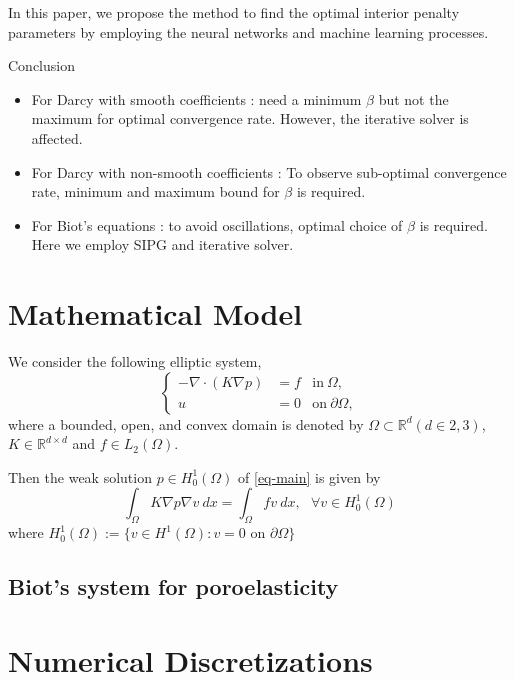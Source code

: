 \documentclass[11pt]{article}
\begin{document}
In this paper, we propose the method to find the optimal interior penalty parameters by employing the neural networks and machine learning processes. 


Conclusion
\begin{itemize}
\item For Darcy with smooth coefficients : need a minimum $\beta$ but not the maximum for optimal convergence rate. However, the iterative solver is affected.
\item For Darcy with non-smooth coefficients : To observe sub-optimal convergence rate, minimum and maximum bound for $\beta$ is required. 
\item For Biot's equations : to avoid oscillations, optimal choice of $\beta$ is required. Here we employ SIPG and iterative solver. 
\end{itemize}

\section{Mathematical Model}
We consider the following elliptic system,  
\begin{equation}\label{eq-main}
\left\{ 
\begin{array}{rll} 
-\nabla \cdot (K \nabla p)
&=  f
& \textrm{in}~\Omega, \\
u&=0& \textrm{on}~\partial \Omega,
\end{array}
\right.
\end{equation}
where a bounded, open, and convex domain is denoted by 
$\Omega \subset \mathbb{R}^d (d \in {2,3})$, $K\in \mathbb{R}^{d\times d}$ and $f \in L_2(\Omega)$.

Then the weak solution $p \in H_0^{1}(\Omega)$ 
of \eqref{eq-main} is given by 
\begin{equation}
\int_\Omega K \nabla p \nabla v \ dx = 
\int_\Omega f  v \ dx, \ \ \ \forall v \in H_0^1(\Omega)
\label{eq-weak}
\end{equation}
where $H_0^1(\Omega):= \{  v \in H^1(\Omega): v = 0 \text{ on } \partial \Omega \}$

\subsection{Biot's system for poroelasticity}

\section{Numerical Discretizations}
\end{document}
